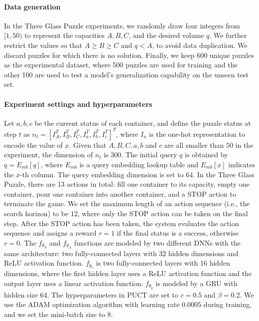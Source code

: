 \paragraph{Data generation} In the Three Glass Puzzle experiments, we randomly draw four integers from $[1, 50)$ to represent the capacities $A, B, C$, and the desired volume $q$. 
We further restrict the values so that $A \geq B \geq C$ and $q < A$, to avoid data duplication. We discard puzzles for which there is no solution. Finally, we keep 600 unique puzzles as the experimental dataset, where 500 puzzles are used for training and the other 100 are used to test a model's generalization capability on the unseen test set.

\paragraph{Experiment settings and hyperparameters}
Let $a, b, c$ be the current status of each container, and define the puzzle status at step $t$ as $n_t = [I_A^T, I_B^T, I_C^T, I_a^T, I_b^T, I_c^T]^T$, where $I_{x}$ is the one-hot representation to encode the value of $x$. 
Given that $A, B, C, a, b$ and $c$ are all smaller than $50$ in the experiment, the dimension of $n_t$ is 300. 
The initial query $q$ is obtained by $q = {E_{mb}}[q]$, where ${E_{mb}}$ is a query embedding lookup table and ${E_{mb}}[x]$ indicates the $x$-th column.
The query embedding dimension is set to $64$.
In the Three Glass Puzzle, there are 13 actions in total: fill one container to its capacity, empty one container, pour one container into another container, and a STOP action to terminate the game. 
We set the maximum length of an action sequence (i.e., the search horizon) to be $12$, where only the STOP action can be taken on the final step.
After the STOP action has been taken, the system evaluates the action sequence and assigns a reward $r = 1$ if the final status is a success, otherwise $r = 0$. The $f_{{\theta}_{S}}$ and $f_{{\theta}_{A}}$ functions are modeled by two different DNNs with the same architecture: two fully-connected layers with 32 hidden dimensions and ReLU activation function.
$f_{{\theta}_{v}}$ is two fully-connected layers with 16 hidden dimensions, where the first hidden layer uses a ReLU activation function and the output layer uses a linear activation function. 
$f_{{\theta}_{q}}$ is modeled by a GRU with hidden size 64.
The hyperparameters in PUCT are set to $c=0.5$ and $\beta=0.2$. We use the ADAM optimization algorithm with learning rate $0.0005$ during training, and we set the mini-batch size to $8$.


